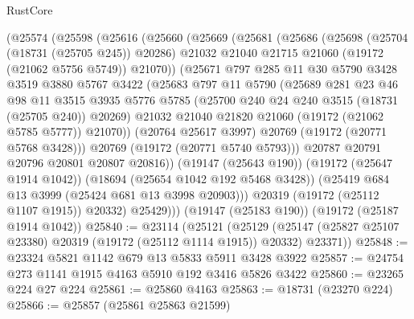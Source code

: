 \begin{lexlean}{RustCore}
\begin{coremodule}
        (@25574
          (@25598
            (@25616
              (@25660
                (@25669
                  (@25681
                    (@25686
                      (@25698
                        (@25704 (@18731 (@25705 @245)) @20286)
                        @21032
                        @21040
                        @21715
                        @21060
                        (@19172 (@21062 @5756 @5749))
                        @21070))
                    (@25671
                      @797
                      @285
                      @11
                      @30
                      @5790
                      @3428
                      @3519
                      @3880
                      @5767
                      @3422
                      (@25683
                        @797
                        @11
                        @5790
                        (@25689
                          @281
                          @23
                          @46
                          @98
                          @11
                          @3515
                          @3935
                          @5776
                          @5785
                          (@25700 @240 @24 @240 @3515 (@18731 (@25705 @240)) @20269)
                          @21032
                          @21040
                          @21820
                          @21060
                          (@19172 (@21062 @5785 @5777))
                          @21070))
                      (@20764 @25617 @3997)
                      @20769
                      (@19172 (@20771 @5768 @3428)))
                    @20769
                    (@19172 (@20771 @5740 @5793)))
                  @20787
                  @20791
                  @20796
                  @20801
                  @20807
                  @20816))
              (@19147 (@25643 @190))
              (@19172 (@25647 @1914 @1042))
              (@18694 (@25654 @1042 @192 @5468 @3428))
              (@25419 @684 @13 @3999 (@25424 @681 @13 @3998 @20903)))
            @20319
            (@19172 (@25112 @1107 @1915))
            @20332)
          @25429)))
    (@19147 (@25183 @190))
    (@19172 (@25187 @1914 @1042))
@25840 := @23114
    (@25121
      (@25129 (@25147 (@25827 @25107 @23380) @20319 (@19172 (@25112 @1114 @1915)) @20332) @23371))
@25848 := @23324 @5821 @1142 @679 @13 @5833 @5911 @3428 @3922
@25857 := @24754 @273 @1141 @1915 @4163 @5910 @192 @3416 @5826 @3422
@25860 := @23265 @224 @27 @224
@25861 := @25860 @4163
@25863 := @18731 (@23270 @224)
@25866 := @25857 (@25861 @25863 @21599)

\end{coremodule}
\end{lexlean}
